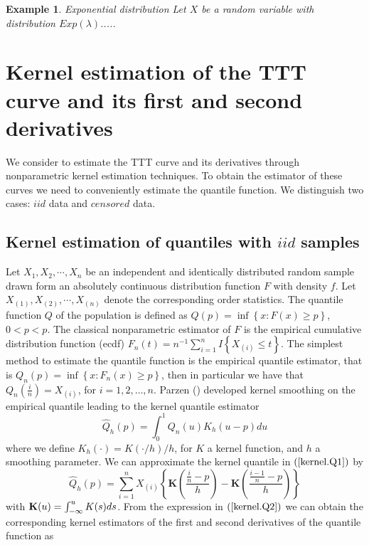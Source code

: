 \documentclass[preprint,12pt]{elsarticle}
\newtheorem{ex}{{\sc Example}}[section]
\begin{document}
\begin{ex}\label{expon}{Exponential distribution}
Let $X$ be a random variable with distribution $Exp(\lambda)$.....
\end{ex}

\section{Kernel estimation of the TTT curve and its first and second derivatives}
We consider to estimate the TTT curve and its derivatives through nonparametric kernel estimation techniques. To obtain the estimator of these curves we need to conveniently estimate the quantile function. We distinguish two cases: $iid$ data and $censored$ data.

\subsection{Kernel estimation of quantiles with $iid$ samples}
Let $X_1,X_2,\cdots,X_n$ be an independent and identically distributed random sample drawn form an absolutely continuous distribution function $F$ with density $f$. Let $X_{(1)},X_{(2)},\cdots,X_{(n)}$ denote the corresponding order statistics. The quantile function $Q$ of the population is defined as $Q(p)=\inf \left\{x: F(x) \geq p\right\}$, $0<p<p$. The classical nonparametric estimator of $F$ is the empirical cumulative distribution function (ecdf) $F_n(t)=n^{-1}\sum_{i=1}^n I\left\{X_{(i)}\leq t\right\}$. The simplest method to estimate the quantile function is the empirical quantile estimator, that is $Q_n(p)=\inf \left\{x: F_n(x) \geq p\right\}$, then in particular we have that $Q_n\left(\frac{i}{n}\right)=X_{(i)}$, for $i=1,2,\ldots, n$. Parzen () developed kernel smoothing on the empirical quantile leading to the kernel quantile estimator
\begin{equation}\label{kernel.Q1}
\widehat{Q}_h(p)=\int_0^1 Q_n(u)K_h(u-p)du
\end{equation}
where we define $K_h(\cdot)=K(\cdot/h)/h$, for $K$ a kernel function, and $h$ a smoothing parameter. We can approximate the kernel quantile in $(\ref{kernel.Q1})$ by
\begin{equation}\label{kernel.Q2}
\widehat{Q}_h(p)=\sum_{i=1}^n X_{(i)}\left\{\textbf{K}\left(\frac{\frac{i}{n}-p}{h}\right)-\textbf{K}\left(\frac{\frac{i-1}{n}-p}{h}\right)\right\}
\end{equation}
with ${\bf K} (u) =\int_{-\infty}^u K(s)ds$. From the expression in $(\ref{kernel.Q2})$ we can obtain the corresponding kernel estimators of the first and second derivatives of the quantile function as
\end{document}
